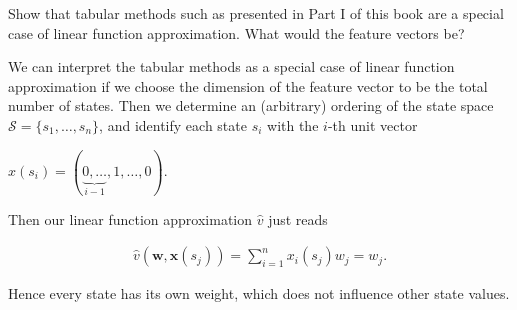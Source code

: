 
\begin{exercise}[Exercise 9.1]

Show that tabular methods such as presented in Part I of this book are
a special case of linear function approximation. What would the feature
vectors be?

\end{exercise}


\begin{solution}

We can interpret the tabular methods as a special case of linear function
approximation if we choose the dimension of the feature vector to be
the total number of states. Then we determine an (arbitrary) ordering
of the state space $\mathcal{S} = \{s_1,\dots,s_n\}$, and identify
each state $s_i$ with the $i$-th unit vector

$x(s_i) = (\underbrace{0,\dots}_{i - 1},1,\dots,0)$.

Then our linear function approximation $\hat{v}$ just reads

\begin{align*}
    \hat{v}(\textbf{w}, \textbf{x}(s_j)) = \sum_{i=1}^n x_i(s_j)w_j
    = w_j.
\end{align*}

Hence every state has its own weight, which does not influence other state values.
\end{solution}

